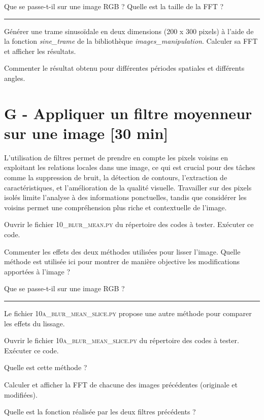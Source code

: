 \Quest Que se passe-t-il sur une image RGB ? Quelle est la taille de la FFT ?

\noindent \rule{\linewidth}{1pt}

\Manip Générer une trame sinusoïdale en deux dimensions (200 x 300 pixels) à l'aide de la fonction \textsl{sine\_trame} de la bibliothèque \textsl{images\_manipulation}. Calculer sa FFT et afficher les résultats.

\Quest Commenter le résultat obtenu pour différentes périodes spatiales et différents angles.


\section{G - Appliquer un filtre moyenneur sur une image {[30 min]}}

L'utilisation de filtres permet de prendre en compte les pixels voisins en exploitant les relations locales dans une image, ce qui est crucial pour des tâches comme la suppression de bruit, la détection de contours, l'extraction de caractéristiques, et l'amélioration de la qualité visuelle. Travailler sur des pixels isolés limite l'analyse à des informations ponctuelles, tandis que considérer les voisins permet une compréhension plus riche et contextuelle de l'image.

\medskip

\Manip Ouvrir le fichier \textsc{10\_blur\_mean.py} du répertoire des codes à tester. Exécuter ce code.

\Quest Commenter les effets des deux méthodes utilisées pour lisser l'image. Quelle méthode est utilisée ici pour montrer de manière objective les modifications apportées à l'image ? 

\Quest Que se passe-t-il sur une image RGB ? 

\noindent \rule{\linewidth}{1pt}

Le fichier \textsc{10a\_blur\_mean\_slice.py} propose une autre méthode pour comparer les effets du lissage.

\Manip Ouvrir le fichier \textsc{10a\_blur\_mean\_slice.py} du répertoire des codes à tester. Exécuter ce code.

\Quest Quelle est cette méthode ? 

\Manip Calculer et afficher la FFT de chacune des images précédentes (originale et modifiées). 

\Quest Quelle est la fonction réalisée par les deux filtres précédents ?

